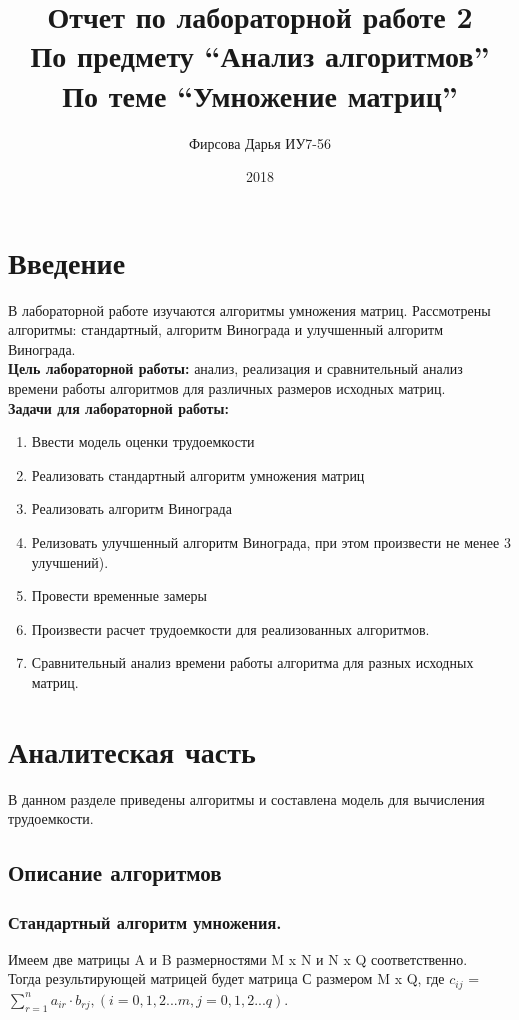 \documentclass[12pt]{article}
\title{Отчет по лабораторной работе 2 \\ 
	По предмету “Анализ алгоритмов” \\
	По теме “Умножение матриц”
}
\date{2018}
\author{Фирсова Дарья ИУ7-56}
\begin{document}
  
	\maketitle  
	\newpage
	\section*{Введение}
	В лабораторной работе изучаются алгоритмы умножения матриц. Рассмотрены алгоритмы: стандартный, алгоритм Винограда и улучшенный алгоритм Винограда. \\
	\textbf{Цель лабораторной работы:} анализ, реализация и сравнительный анализ времени работы алгоритмов для различных размеров исходных матриц. \\
	 \textbf{Задачи для лабораторной работы:}
\begin{enumerate}
	\item Ввести модель оценки трудоемкости
	\item Реализовать стандартный алгоритм умножения матриц
	\item Реализовать алгоритм Винограда
	\item Релизовать улучшенный алгоритм Винограда, при этом произвести не менее 3 улучшений).
	\item Провести временные замеры
	\item Произвести расчет трудоемкости для реализованных алгоритмов.
	\item Сравнительный анализ времени работы алгоритма для разных исходных матриц.
\end{enumerate}
\newpage

\section{Аналитеская часть}
В данном разделе приведены алгоритмы и составлена модель для вычисления трудоемкости.
\subsection{Описание алгоритмов}

\subsubsection{Стандартный алгоритм умножения. }

Имеем две матрицы A и B размерностями M x N и N x Q соответственно. \\Тогда результирующей матрицей будет матрица С размером M x Q, где $c_{ij}$ = $\sum_{r=1}^n a_{ir}\cdot b_{rj} ,   (i = 0,1,2...m, j = 0,1,2...q)$.
\\
\\
\end{document}
